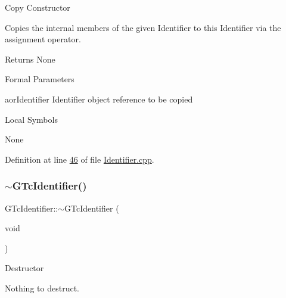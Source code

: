 Copy Constructor

Copies the internal members of the given Identifier to this Identifier via the assignment operator.

\begin{DoxyReturn}{Returns}
None
\end{DoxyReturn}
\begin{DoxyParagraph}{Formal Parameters}

\begin{DoxyPre}{\ttfamily [ in ]  aorIdentifier    Identifier object reference to be copied }\end{DoxyPre}

\end{DoxyParagraph}
\begin{DoxyParagraph}{Local Symbols}

\begin{DoxyPre}{\ttfamily  None }\end{DoxyPre}
 
\end{DoxyParagraph}


Definition at line \mbox{\hyperlink{_identifier_8cpp_source_l00046}{46}} of file \mbox{\hyperlink{_identifier_8cpp_source}{Identifier.\+cpp}}.

\mbox{\label{class_g_n_common_1_1_g_n_notification_1_1_g_tc_identifier_a52743b4f0217c00b0af8cc7f72e42f8a}} 
\subsubsection{\texorpdfstring{$\sim$\+G\+Tc\+Identifier()}{~GTcIdentifier()}}
{\footnotesize\ttfamily G\+Tc\+Identifier\+::$\sim$\+G\+Tc\+Identifier (\begin{DoxyParamCaption}\item[{void}]{ }\end{DoxyParamCaption})}

Destructor

Nothing to destruct.


